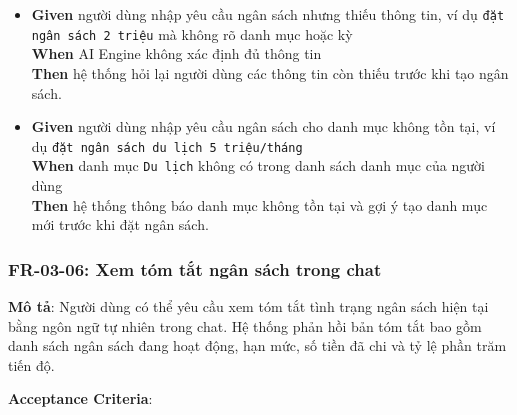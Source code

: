 \begin{itemize}
\item \textbf{Given} người dùng nhập yêu cầu ngân sách nhưng thiếu thông tin, ví dụ \texttt{đặt ngân sách 2 triệu} mà không rõ danh mục hoặc kỳ  \\ \hspace*{1.5em}  \textbf{When} AI Engine không xác định đủ thông tin  \\ \hspace*{1.5em}  \textbf{Then} hệ thống hỏi lại người dùng các thông tin còn thiếu trước khi tạo ngân sách.
\item \textbf{Given} người dùng nhập yêu cầu ngân sách cho danh mục không tồn tại, ví dụ \texttt{đặt ngân sách du lịch 5 triệu/tháng}  \\ \hspace*{1.5em}  \textbf{When} danh mục \texttt{Du lịch} không có trong danh sách danh mục của người dùng  \\ \hspace*{1.5em}  \textbf{Then} hệ thống thông báo danh mục không tồn tại và gợi ý tạo danh mục mới trước khi đặt ngân sách.
\end{itemize}
\subsubsection{FR-03-06: Xem tóm tắt ngân sách trong chat}

\textbf{Mô tả}: Người dùng có thể yêu cầu xem tóm tắt tình trạng ngân sách hiện tại bằng ngôn ngữ tự nhiên trong chat. Hệ thống phản hồi bản tóm tắt bao gồm danh sách ngân sách đang hoạt động, hạn mức, số tiền đã chi và tỷ lệ phần trăm tiến độ.



\textbf{Acceptance Criteria}:

